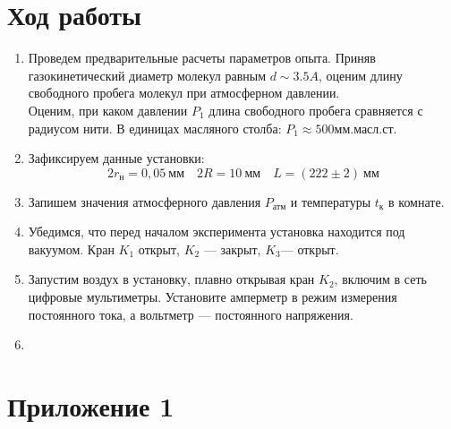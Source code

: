\documentclass[12pt]{article}
\begin{document}
    \section{Ход работы}     
        \begin{enumerate}
            \item Проведем предварительные расчеты параметров опыта. Приняв газокинетический диаметр молекул равным $d \sim 3.5 A$, оценим
            длину свободного пробега молекул при атмосферном давлении.\\
            Оценим, при каком давлении $P_1$ длина свободного пробега сравняется с радиусом нити. В единицах масляного столба: $P_1 \approx 500 \text{мм.масл.ст.}$
            \item  Зафиксируем данные установки:
            \[2r_\text{н} = 0,05~\text{мм}\quad 2R = 10~\text{мм} \quad L = (222\pm 2)~\text{мм}\]
            \item Запишем значения атмосферного давления $P_{\text{атм}}$ и температуры $t_{\text{к}}$ в комнате.
            \item Убедимся, что перед началом эксперимента установка находится под вакуумом. Кран $K_1$ открыт, $K_2$ — закрыт, $K_3$— открыт.
            \item Запустим воздух в установку, плавно открывая кран $K_2$, включим в сеть цифровые мультиметры. Установите амперметр в режим
            измерения постоянного тока, а вольтметр — постоянного напряжения.
            \item 
            
                    
        \end{enumerate}

\newpage
\section{Приложение 1}
\end{document}
